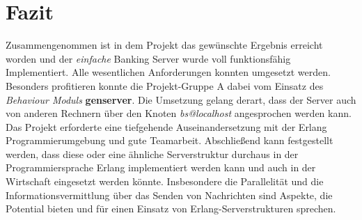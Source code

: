 \section{Fazit}

Zusammengenommen ist in dem Projekt das gewünschte Ergebnis erreicht worden und der \textit{einfache} Banking Server wurde voll funktionsfähig Implementiert. Alle wesentlichen Anforderungen konnten umgesetzt werden. Besonders profitieren konnte die Projekt-Gruppe A dabei vom Einsatz des \textit{Behaviour Moduls} \textbf{gen\textunderscore server}. Die Umsetzung gelang derart, dass der Server auch von anderen Rechnern über den Knoten \textit{bs@localhost} angesprochen werden kann. Das Projekt erforderte eine tiefgehende Auseinandersetzung mit der Erlang Programmierumgebung und gute Teamarbeit. Abschließend kann festgestellt werden, dass diese oder eine ähnliche Serverstruktur durchaus in der Programmiersprache Erlang implementiert werden kann und auch in der Wirtschaft eingesetzt werden könnte. Insbesondere die Parallelität und die Informationsvermittlung über das Senden von Nachrichten sind Aspekte, die Potential bieten und für einen Einsatz von Erlang-Serverstrukturen sprechen.